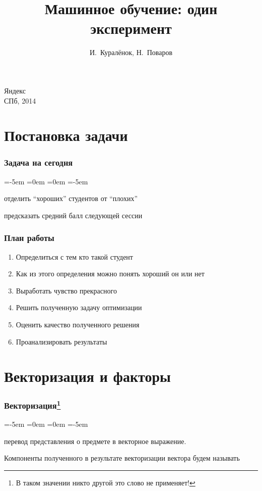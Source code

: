 \documentclass[14pt, fleqn, xcolor={dvipsnames, table}, hyperref={unicode}, babel={english,russian}, inputenc=utf8x]{beamer}
\title{Машинное обучение: один эксперимент\\\small{}}
\author[]{\small{%
И.~Куралёнок,
Н.~Поваров}}
\date{}
\begin{document}
\begin{frame}
\maketitle
\small
\begin{center}
\vspace{-60pt}
\normalsize {\color{red}Я}ндекс \\
\vspace{80pt}
\footnotesize СПб, 2014
\end{center}
\end{frame}

\section{Постановка задачи}
\begin{frame}
\frametitle{Задача на сегодня}
\begin{description}
\leftmargin=-5em
\itemindent=0em
=0em
\leftskip=-5em
\item[Задача:] отделить ``хороших'' студентов от ``плохих''
\item
\item[Формально:] предсказать средний балл следующей сессии
\end{description}
\end{frame}

\begin{frame}
\frametitle{План работы}
\begin{enumerate}
\item Определиться с тем кто такой студент
\item Как из этого определения можно понять хороший он или нет
\item Выработать чувство прекрасного
\item Решить полученную задачу оптимизации
\item Оценить качество полученного решения
\item Проанализировать результаты
\end{enumerate}
\end{frame}

\section{Векторизация и факторы}
\begin{frame}
\frametitle{Векторизация\footnote{В таком значении никто другой это слово не применяет!}}
\begin{description}
\leftmargin=-5em
\itemindent=0em
=0em
\leftskip=-5em
\item[Векторизация:] перевод представления о предмете в векторное выражение.
\item[]
\item[] Компоненты полученного в результате векторизации вектора будем называть {}
\end{description}
\end{frame}
\end{document}
